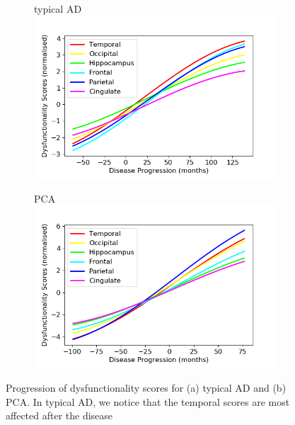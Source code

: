 \documentclass{llncs}
\begin{document}
\begin{figure}
\begin{subfigure}{0.47\textwidth}
\centering
typical AD\\
\includegraphics[width=\textwidth, trim=0 0 0 20, clip]{figures/tAD_trajSameSpace_tad-drcTinyPen1_JMD.png} 
\caption{}
\end{subfigure}
\begin{subfigure}{0.47\textwidth}
\centering
PCA\\
\includegraphics[width=\textwidth, trim=0 0 0 20, clip]{figures/PCA_trajSameSpace_tad-drcTinyPen1_JMD.png} 
\caption{}
\end{subfigure}
\caption{Progression of dysfunctionality scores for (a) typical AD and (b) PCA. In typical AD, we notice that the temporal scores are most affected after the disease }
\label{fig:pcaTadDisSpace}
\end{figure}
\end{document}
